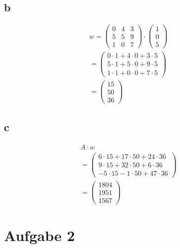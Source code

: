 \subsection{b}
\begin{align*}
    w = \begin{pmatrix}
        0 & 4 & 3 \\ 5 & 5 & 9 \\ 1 & 0 & 7
    \end{pmatrix} \cdot \begin{pmatrix}
        1 \\ 0 \\ 5
    \end{pmatrix} \\
    = \begin{pmatrix}
        0 \cdot 1 + 4 \cdot 0 + 3 \cdot 5 \\ 5 \cdot 1 + 5 \cdot 0 + 9 \cdot 5 \\ 1 \cdot 1 + 0 \cdot 0 + 7 \cdot 5
    \end{pmatrix} \\
    = \begin{pmatrix}
        15 \\ 50 \\ 36
    \end{pmatrix}
\end{align*}


\subsection{c}
\begin{align*}
    A \cdot w \\
    = \begin{pmatrix}
        6 \cdot 15 + 17 \cdot 50 + 24 \cdot 36 \\ 
        9 \cdot 15 + 32 \cdot 50 + 6 \cdot 36 \\ 
        -5 \cdot 15 - 1 \cdot 50 + 47 \cdot 36
    \end{pmatrix} \\
    = \begin{pmatrix}
        1804 \\ 1951 \\ 1567
    \end{pmatrix}
\end{align*}

\section{Aufgabe 2}

